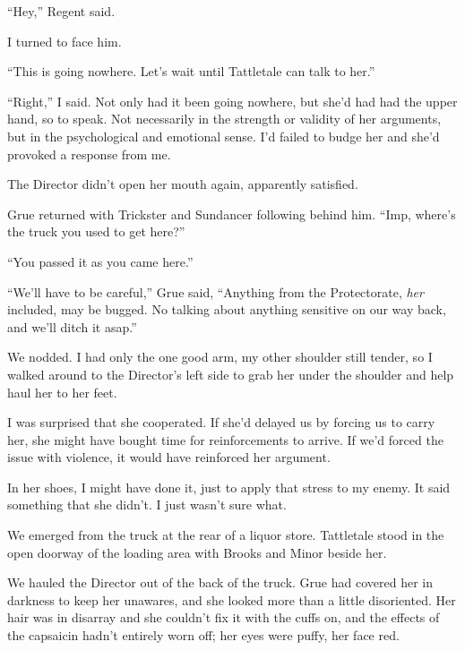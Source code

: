 ``Hey,'' Regent said.



I turned to face him.



``This is going nowhere.  Let's wait until Tattletale can talk to her.''



``Right,'' I said.  Not only had it been going nowhere, but she'd had had the upper hand, so to speak.  Not necessarily in the strength or validity of her arguments, but in the psychological and emotional sense.  I'd failed to budge her and she'd provoked a response from me.



The Director didn't open her mouth again, apparently satisfied.



Grue returned with Trickster and Sundancer following behind him.  ``Imp, where's the truck you used to get here?''



``You passed it as you came here.''



``We'll have to be careful,'' Grue said,  ``Anything from the Protectorate, \emph{her} included, may be bugged.  No talking about anything sensitive on our way back, and we'll ditch it asap.''



We nodded.  I had only the one good arm, my other shoulder still tender, so I walked around to the Director's left side to grab her under the shoulder and help haul her to her feet.



I was surprised that she cooperated.  If she'd delayed us by forcing us to carry her, she might have bought time for reinforcements to arrive.  If we'd forced the issue with violence, it would have reinforced her argument.



In her shoes, I might have done it, just to apply that stress to my enemy.  It said something that she didn't.  I just wasn't sure what.



\sectionbreak



We emerged from the truck at the rear of a liquor store.  Tattletale stood in the open doorway of the loading area with Brooks and Minor beside her.



We hauled the Director out of the back of the truck.  Grue had covered her in darkness to keep her unawares, and she looked more than a little disoriented.  Her hair was in disarray and she couldn't fix it with the cuffs on, and the effects of the capsaicin hadn't entirely worn off; her eyes were puffy, her face red.



